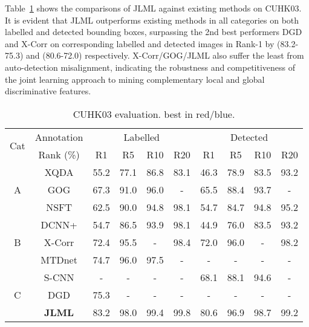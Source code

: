 \documentclass{article}
\begin{document}
\vspace{0.1cm}
Table~\ref{tab:res_cuhk03} shows the comparisons of JLML against 
existing methods on CUHK03. 
It is evident that JLML outperforms existing methods in all categories
on both labelled and detected bounding boxes,
surpassing the 2nd best performers DGD and X-Corr on corresponding labelled and
detected images in Rank-1 by (83.2-75.3) and (80.6-72.0)
respectively. 
X-Corr/GOG/JLML also suffer the least from auto-detection
misalignment, indicating the robustness and competitiveness of the
joint learning approach to mining complementary local and global
discriminative features. 





\begin{table} \centering
\footnotesize
\renewcommand{\arraystretch}{1}
	\setlength{\tabcolsep}{0.1 cm}
	\vspace{-.3cm}
	\caption{\footnotesize
		CUHK03 evaluation.  best in
		red/blue.
}
	\vskip 0pt \begin{tabular}{|c||c|cccc|cccc|}
		\hline
\multirow{2}{*}{Cat}
		& Annotation &  \multicolumn{4}{c|}{Labelled} &\multicolumn{4}{c|}{Detected} \\ \cline{2-10}
		& Rank (\%) & R1 & R5 & R10 & R20 & R1 & R5 & R10 & R20 \\ \hline \hline
		\multirow{3}{*}{A}
		& XQDA & 55.2  & 77.1  &  86.8 &  83.1   & 46.3  & 78.9  &  83.5 &  93.2 \\   & GOG & 67.3  & 91.0  &  96.0 &  -   & 65.5  & 88.4  &  93.7 &  - \\  & NSFT & 62.5  & 90.0  & 94.8 &  98.1   & 54.7  & 84.7 &  \color{blue}  94.8 &  95.2 \\ 
		\hline
		\multirow{3}{*}{B}
		& DCNN+ & 54.7  & 86.5  &  93.9 &  98.1   & 44.9  & 76.0  &  83.5 &  93.2 \\
		& X-Corr & 72.4  & 95.5  &  - &  \color{blue}  98.4  &  \color{blue}  72.0  &  \color{blue}  96.0  &  - &  \color{blue}   98.2 \\ 
& MTDnet & 74.7 &  \color{blue}  96.0 &  \color{blue}   97.5 &  - &  -   & -  & -  &  - \\
		\hline
\multirow{3}{*}{C}
		& S-CNN & -  & -  &  - &  -   & 68.1  & 88.1  &  94.6 &  -\\ 
		& DGD &  \color{blue}   75.3  & -  &  - &  - & -  & -  &  - & - \\ 
& {\bf JLML} & \color{red} 83.2 & \color{red} 98.0 & \color{red}  99.4 &  \color{red}  99.8
		&  \color{red}  80.6 &  \color{red}  96.9 &  \color{red}  98.7 &   \color{red}  99.2 \\
		\hline
	\end{tabular}\label{tab:res_cuhk03}
	\vspace{-.1cm}
\end{table}
\end{document}
